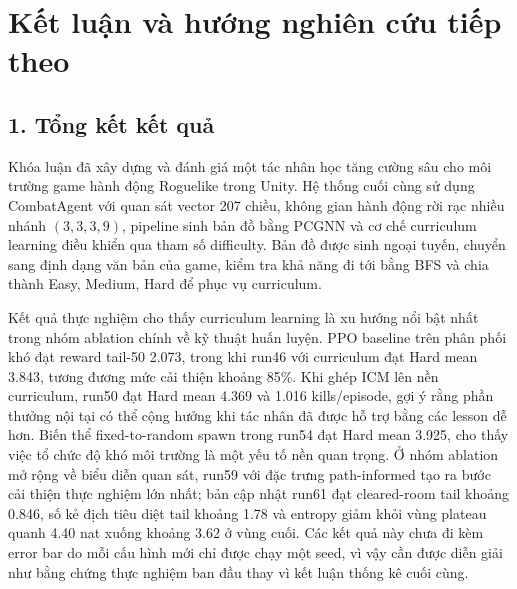 \clearpage
{}


\chapter*{Kết luận và hướng nghiên cứu tiếp theo}

\section*{1. Tổng kết kết quả}

Khóa luận đã xây dựng và đánh giá một tác nhân học tăng cường sâu cho môi trường game hành động Roguelike trong Unity. Hệ thống cuối cùng sử dụng CombatAgent với quan sát vector 207 chiều, không gian hành động rời rạc nhiều nhánh $(3,3,3,9)$, pipeline sinh bản đồ bằng PCGNN và cơ chế curriculum learning điều khiển qua tham số difficulty. Bản đồ được sinh ngoại tuyến, chuyển sang định dạng văn bản của game, kiểm tra khả năng đi tới bằng BFS và chia thành Easy, Medium, Hard để phục vụ curriculum.

Kết quả thực nghiệm cho thấy curriculum learning là xu hướng nổi bật nhất trong nhóm ablation chính về kỹ thuật huấn luyện. PPO baseline trên phân phối khó đạt reward tail-50 2.073, trong khi run46 với curriculum đạt Hard mean 3.843, tương đương mức cải thiện khoảng 85\%. Khi ghép ICM lên nền curriculum, run50 đạt Hard mean 4.369 và 1.016 kills/episode, gợi ý rằng phần thưởng nội tại có thể cộng hưởng khi tác nhân đã được hỗ trợ bằng các lesson dễ hơn. Biến thể fixed-to-random spawn trong run54 đạt Hard mean 3.925, cho thấy việc tổ chức độ khó môi trường là một yếu tố nền quan trọng. Ở nhóm ablation mở rộng về biểu diễn quan sát, run59 với đặc trưng path-informed tạo ra bước cải thiện thực nghiệm lớn nhất; bản cập nhật run61 đạt cleared-room tail khoảng 0.846, số kẻ địch tiêu diệt tail khoảng 1.78 và entropy giảm khỏi vùng plateau quanh 4.40 nat xuống khoảng 3.62 ở vùng cuối. Các kết quả này chưa đi kèm error bar do mỗi cấu hình mới chỉ được chạy một seed, vì vậy cần được diễn giải như bằng chứng thực nghiệm ban đầu thay vì kết luận thống kê cuối cùng.

